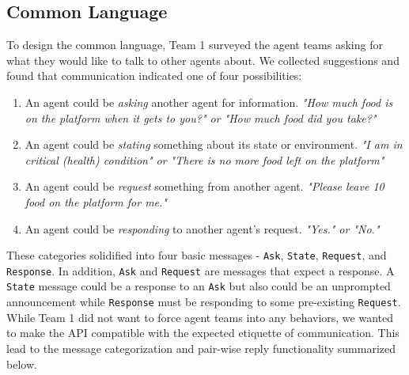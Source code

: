 \documentclass{article}
\begin{document}
\subsection{Common Language}
To design the common language, Team 1 surveyed the agent teams asking for what they would like to talk to other agents about. We collected suggestions and found that communication indicated one of four possibilities:
\begin{enumerate}
    \item An agent could be \textit{asking} another agent for information. \textit{"How much food is on the platform when it gets to you?" or "How much food did you take?"}
    \item An agent could be \textit{stating} something about its state or environment. \textit{"I am in critical (health) condition" or "There is no more food left on the platform"}
    \item An agent could be \textit{request} something from another agent. \textit{"Please leave 10 food on the platform for me."}
    \item An agent could be \textit{responding} to another agent's request. \textit{"Yes." or "No."}
\end{enumerate}
These categories solidified into four basic messages - \texttt{Ask}, \texttt{State}, \texttt{Request}, and \texttt{Response}. \newline
In addition, \texttt{Ask} and \texttt{Request} are messages that expect a response. A \texttt{State} message could be a response to an \texttt{Ask} but also could be an unprompted announcement while \texttt{Response} must be responding to some pre-existing \texttt{Request}. \newline 
While Team 1 did not want to force agent teams into any behaviors, we wanted to make the API compatible with the expected etiquette of communication. This lead to the message categorization and pair-wise reply functionality summarized below.
\end{document}
